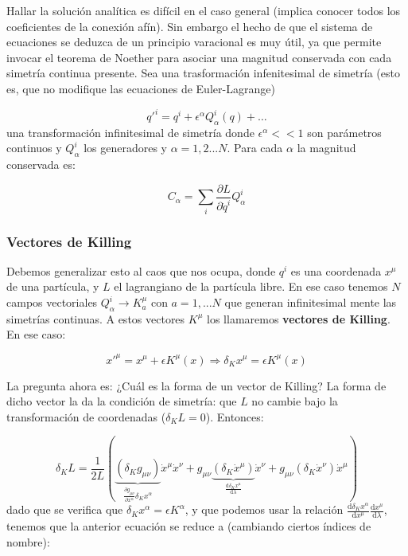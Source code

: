 \documentclass[12pt,a4paper]{book}
\numberwithin{equation}{section}
\numberwithin{figure}{section}
\newcommand{\parentesis}[1]{\left( #1  \right)}
\newcommand{\parciales}[2]{\frac{\partial #1}{\partial #2}}
\newcommand{\D}{\mathrm{d}}
\newcommand{\derivadas}[2]{\frac{\D #1}{\D #2}}
\begin{document}
Hallar la solución analítica es difícil en el caso general (implica conocer todos los coeficientes de la conexión afín). Sin embargo el hecho de que el sistema de ecuaciones se deduzca de un principio varacional es muy útil, ya que permite invocar el teorema de Noether para asociar una magnitud conservada con cada simetría continua presente. Sea  una trasformación infenitesimal de simetría (esto es, que no modifique las ecuaciones de Euler-Lagrange) 

\begin{equation}
q'^i = q^i + \epsilon^\alpha Q_{\alpha}^i (q) + \ldots
\end{equation}
una transformación infinitesimal de simetría donde $\epsilon^\alpha << 1$ son parámetros continuos y $Q_\alpha^i$ los generadores y $\alpha=1,2...N$. Para cada $\alpha$ la magnitud conservada es:

\begin{equation}
C_\alpha = \sum_i \parciales{L}{\dot{q}^i} Q_\alpha^i
\end{equation}

\subsubsection{Vectores de Killing}
Debemos generalizar esto al caos que nos ocupa, donde $q^i$ es una coordenada $x^\mu$ de una partícula, y $L$ el lagrangiano de la partícula libre. En ese caso tenemos $N$ campos vectoriales $Q_\alpha^i \rightarrow K_a^\mu$ con $a=1,...N$ que generan infinitesimal mente las simetrías continuas. A estos vectores $K^\mu$ los llamaremos \textbf{vectores de Killing}. En ese caso:

\begin{equation}
x'^\mu = x^\mu + \epsilon K^\mu (x) \Rightarrow \delta_K x^\mu = \epsilon K^\mu (x)
\end{equation}

La pregunta ahora es: ¿Cuál es la forma de un vector de Killing? La forma de dicho vector la da la condición de simetría: que $L$ no cambie bajo la transformación de coordenadas ($\delta_K L=0$). Entonces:

\begin{equation}
\delta_K L = \frac{1}{2L} \parentesis{ \underbrace{(\delta_K g_{\mu \nu})}_{\parciales{g_{\mu \nu}}{x^\alpha}\delta_K x^\alpha} \dot{x}^\mu \dot{x}^\nu + g_{\mu \nu} \underbrace{(\delta_K \dot{x}^\mu)}_{\derivadas{\delta_K x^\mu}{\lambda}} \dot{x}^\nu  + g_{\mu \nu} (\delta_K \dot{x}^\nu) \dot{x}^\mu  } 
\end{equation}
dado que se verifica que $\delta_K x^\alpha = \epsilon K^\alpha$, y que podemos usar la relación $\derivadas{\delta_K x^\alpha}{x^\mu}\derivadas{x^\mu}{\lambda}$, tenemos que la anterior ecuación se reduce a (cambiando ciertos índices de nombre): 
\end{document}
